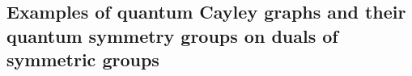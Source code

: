 \documentclass[12pt]{amsart}
\theoremstyle{definition}
\theoremstyle{definition}
\theoremstyle{definition}
\theoremstyle{definition}
\newtheorem{remark}[thm]{Remark}
\DeclareMathOperator{\Aut}{Aut}
\newcommand{\C}{\mathbb{C}}
\numberwithin{equation}{section}
\begin{document}

\subsection{Examples of quantum Cayley graphs and their quantum symmetry groups on duals of symmetric groups}
\end{document}
